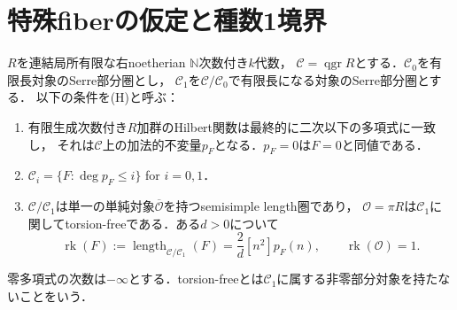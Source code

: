 \documentclass[11pt,a4paper]{ltjsarticle}
\theoremstyle{definition}
\newcommand{\OO}{\mathcal O}
\newcommand{\CC}{\mathcal C}
\newcommand{\qgr}{\operatorname{qgr}}
\newcommand{\rk}{\operatorname{rk}}
\newcommand{\len}{\operatorname{length}}
\begin{document}
\section{特殊fiberの仮定と種数1境界}\label{sec:field}
$R$を連結局所有限な右noetherian $\mathbb N$次数付き$k$代数，
$\CC=\qgr R$とする．$\CC_0$を有限長対象のSerre部分圏とし，
$\CC_1$を$\CC/\CC_0$で有限長になる対象のSerre部分圏とする．
以下の条件を\textup{(H)}と呼ぶ：
\begin{enumerate}
\item 有限生成次数付き$R$加群のHilbert関数は最終的に二次以下の多項式に一致し，
  それは$\CC$上の加法的不変量$p_F$となる．$p_F=0$は$F=0$と同値である．
\item $\CC_i=\{F:\deg p_F\leq i\}$ for $i=0,1$．
\item $\CC/\CC_1$は単一の単純対象$\overline{\OO}$を持つsemisimple length圏であり，
  $\OO=\pi R$は$\CC_1$に関してtorsion-freeである．ある$d>0$について
\begin{equation}\label{eq:special-rank}
 \rk(F):=\len_{\CC/\CC_1}(F)=\frac2d[n^2]p_F(n),\qquad \rk(\OO)=1.
\end{equation}
\end{enumerate}
零多項式の次数は$-\infty$とする．torsion-freeとは$\CC_1$に属する非零部分対象を持たないことをいう．
\end{document}
